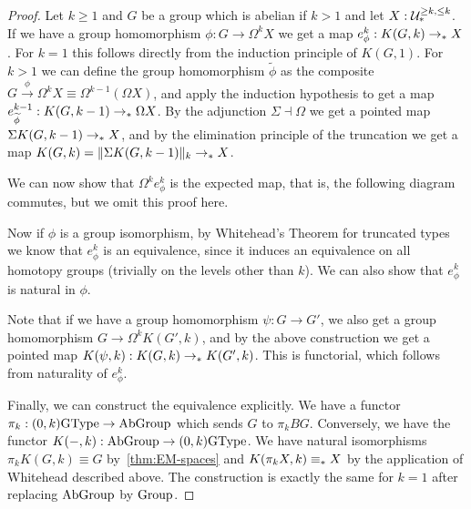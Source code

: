 \begin{proof}
  Let $k\ge1$ and $G$ be a group which is abelian if $k>1$ and let $X:\UU_\pt^{\ge k,\le k}$. If we have a group homomorphism $\phi : G \to \Omega^k X$ we get a map $e_\phi^k:K(G,k)\to_\pt X$. For $k=1$ this follows directly from the induction principle of $K(G,1)$. For $k>1$ we can define the group homomorphism $\widetilde\phi$ as the composite $G \xrightarrow{\phi} \Omega^k X \equiv \Omega^{k-1}(\Omega X)$, and apply the induction hypothesis to get a map
  $e_{\widetilde\phi}^{k-1}:K(G,k-1)\to_\pt \Omega X$. By the adjunction $\Sigma\dashv\Omega$ we get a pointed map $\Sigma K(G,k-1)\to_\pt X$, and by the elimination principle of the truncation we get a map $K(G,k)=\trunc{k}{\Sigma K(G,k-1)}\to_\pt X$. 

  We can now show that $\Omega^k e_\phi^k$ is the expected map, that is, the following diagram commutes, but we omit this proof here.
  \begin{center}
  \end{center}
  Now if $\phi$ is a group isomorphism, by Whitehead's Theorem for truncated types \cite[Theorem 8.8.3]{TheBook} we know that $e_\phi^k$ is an equivalence, since it induces an equivalence on all homotopy groups (trivially on the levels other than $k$). We can also show that $e_\phi^k$ is natural in $\phi$.

  Note that if we have a group homomorphism $\psi:G\to G'$, we also get a group homomorphism $G\to\Omega^k K(G',k)$, and by the above construction we get a pointed map $K(\psi,k):K(G,k)\to_\pt K(G',k)$. This is functorial, which follows from naturality of $e_\phi^k$. 

  Finally, we can construct the equivalence explicitly. We have a functor
  $\pi_k:(0,k)\GType \to \AbGroup$ which sends $G$ to $\pi_k BG$. Conversely, we have the functor $K({-},k):\AbGroup\to (0,k)\GType$. We have natural isomorphisms
  $\pi_k K(G,k)\equiv G$ by~\autoref{thm:EM-spaces} and $K(\pi_k X,k)\equiv_\pt X$ by the application of Whitehead described above. The construction is exactly the same for $k=1$ after replacing $\AbGroup$ by $\Group$.
\end{proof}

